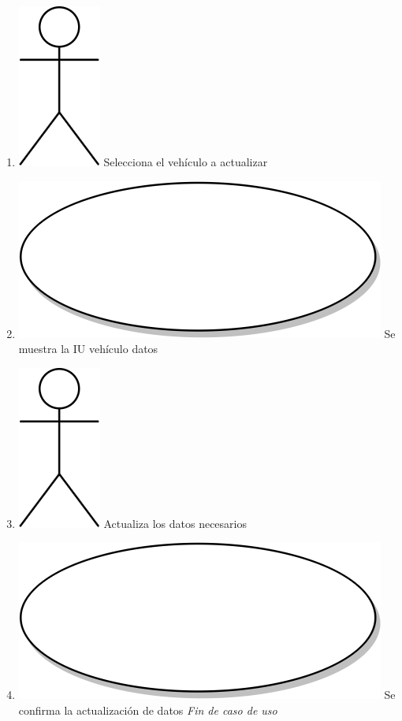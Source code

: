 \begin{enumerate}
  \item {\includegraphics[scale=.1]{Capitulo3/img/actor.png} Selecciona el vehículo a actualizar }
  \item {\includegraphics[scale=.05]{Capitulo3/img/proceso.png} Se muestra la IU vehículo datos }
  \item {\includegraphics[scale=.1]{Capitulo3/img/actor.png} Actualiza los datos necesarios }
  \item {\includegraphics[scale=.05]{Capitulo3/img/proceso.png} Se confirma la actualización de datos }
    \textit{Fin de caso de uso} \\  
\end{enumerate}



